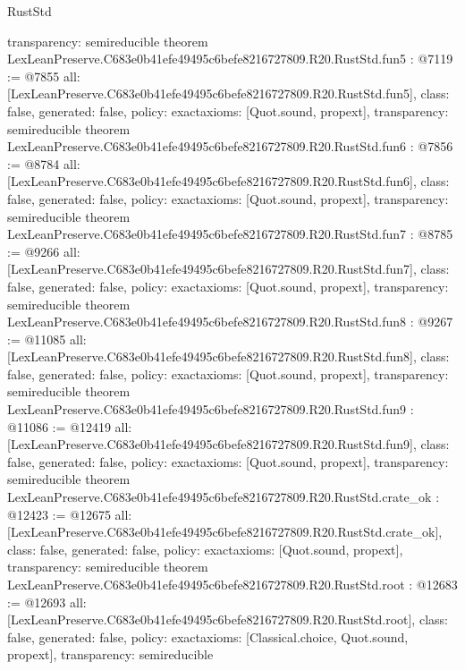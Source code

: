 \begin{lexlean}{RustStd}
\begin{coremodule}
{  transparency: semireducible
}
theorem LexLeanPreserve.C683e0b41efe49495c6befe8216727809.R20.RustStd.fun5 : @7119 := @7855 {
  all: [LexLeanPreserve.C683e0b41efe49495c6befe8216727809.R20.RustStd.fun5],
  class: false,
  generated: false,
  policy: exact{axioms: [Quot.sound, propext]},
  transparency: semireducible
}
theorem LexLeanPreserve.C683e0b41efe49495c6befe8216727809.R20.RustStd.fun6 : @7856 := @8784 {
  all: [LexLeanPreserve.C683e0b41efe49495c6befe8216727809.R20.RustStd.fun6],
  class: false,
  generated: false,
  policy: exact{axioms: [Quot.sound, propext]},
  transparency: semireducible
}
theorem LexLeanPreserve.C683e0b41efe49495c6befe8216727809.R20.RustStd.fun7 : @8785 := @9266 {
  all: [LexLeanPreserve.C683e0b41efe49495c6befe8216727809.R20.RustStd.fun7],
  class: false,
  generated: false,
  policy: exact{axioms: [Quot.sound, propext]},
  transparency: semireducible
}
theorem LexLeanPreserve.C683e0b41efe49495c6befe8216727809.R20.RustStd.fun8 : @9267 := @11085 {
  all: [LexLeanPreserve.C683e0b41efe49495c6befe8216727809.R20.RustStd.fun8],
  class: false,
  generated: false,
  policy: exact{axioms: [Quot.sound, propext]},
  transparency: semireducible
}
theorem LexLeanPreserve.C683e0b41efe49495c6befe8216727809.R20.RustStd.fun9 : @11086 := @12419 {
  all: [LexLeanPreserve.C683e0b41efe49495c6befe8216727809.R20.RustStd.fun9],
  class: false,
  generated: false,
  policy: exact{axioms: [Quot.sound, propext]},
  transparency: semireducible
}
theorem LexLeanPreserve.C683e0b41efe49495c6befe8216727809.R20.RustStd.crate_ok : @12423 := @12675 {
  all: [LexLeanPreserve.C683e0b41efe49495c6befe8216727809.R20.RustStd.crate_ok],
  class: false,
  generated: false,
  policy: exact{axioms: [Quot.sound, propext]},
  transparency: semireducible
}
theorem LexLeanPreserve.C683e0b41efe49495c6befe8216727809.R20.RustStd.root : @12683 := @12693 {
  all: [LexLeanPreserve.C683e0b41efe49495c6befe8216727809.R20.RustStd.root],
  class: false,
  generated: false,
  policy: exact{axioms: [Classical.choice, Quot.sound, propext]},
  transparency: semireducible
}


\end{coremodule}
\end{lexlean}
